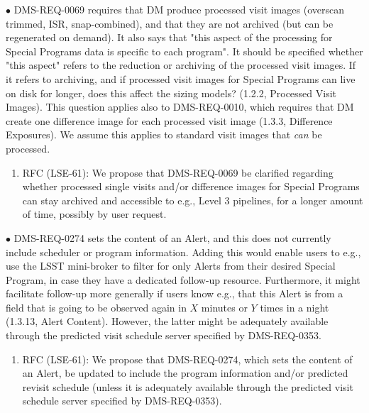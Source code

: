 $\bullet$ DMS-REQ-0069 requires that DM produce processed visit images (overscan trimmed, ISR, snap-combined), and that they are not archived (but can be regenerated on demand). It also says that "this aspect of the processing for Special Programs data is specific to each program". It should be specified whether "this aspect" refers to the reduction or archiving of the processed visit images. If it refers to archiving, and if processed visit images for Special Programs can live on disk for longer, does this affect the sizing models? (1.2.2, Processed Visit Images). This question applies also to DMS-REQ-0010, which requires that DM create one difference image for each processed visit image (1.3.3, Difference Exposures). We assume this applies to standard visit images that \textit{can} be processed.
\begin{enumerate}[resume,topsep=-10pt,after=\vspace{10pt},label= \textbf{Action \Roman*}] \item \label{DMSR-2} RFC (LSE-61): We propose that DMS-REQ-0069 be clarified regarding whether processed single visits and/or difference images for Special Programs can stay archived and accessible to e.g., Level 3 pipelines, for a longer amount of time, possibly by user request. \end{enumerate}

$\bullet$ DMS-REQ-0274 sets the content of an Alert, and this does not currently include scheduler or program information. Adding this would enable users to e.g., use the LSST mini-broker to filter for only Alerts from their desired Special Program, in case they have a dedicated follow-up resource. Furthermore, it might facilitate follow-up more generally if users know e.g., that this Alert is from a field that is going to be observed again in $X$ minutes or $Y$ times in a night (1.3.13, Alert Content). However, the latter might be adequately available through the predicted visit schedule server specified by DMS-REQ-0353.
\begin{enumerate}[resume,topsep=-10pt,after=\vspace{10pt},label= \textbf{Action \Roman*}] \item \label{DMSR-4} RFC (LSE-61): We propose that DMS-REQ-0274, which sets the content of an Alert, be updated to include the program information and/or predicted revisit schedule (unless it is adequately available through the predicted visit schedule server specified by DMS-REQ-0353). \end{enumerate}

